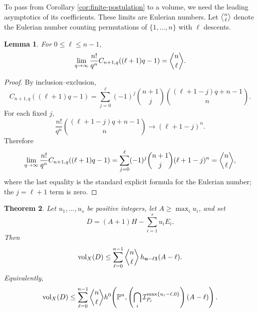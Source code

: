 \documentclass[11pt]{amsart}
\newtheorem{theorem}{Theorem}[section]
\newtheorem{lemma}[theorem]{Lemma}
\theoremstyle{remark}
\newcommand{\PP}{\mathbb P}
\newcommand{\vol}{\operatorname{vol}}
\newcommand{\eul}[2]{\genfrac{\langle}{\rangle}{0pt}{}{#1}{#2}}
\begin{document}
To pass from Corollary \ref{cor:finite-postulation} to a volume, we need the leading asymptotics of its coefficients. These limits are Eulerian numbers. Let $\eul{n}{\ell}$ denote the Eulerian number counting permutations of $\{1,\ldots,n\}$ with $\ell$ descents.


\begin{lemma}\label{lem:Eulerian}
For $0\le\ell\le n-1$,
\begin{equation}\label{eq:Eulerian-limit}
\lim_{q\to\infty}
\frac{n!}{q^n}
C_{n+1,q}((\ell+1)q-1)
=
\eul{n}{\ell}.
\end{equation}
\end{lemma}

\begin{proof}
By inclusion--exclusion,
$$
C_{n+1,q}((\ell+1)q-1)
=
\sum_{j=0}^{\ell}
(-1)^j\binom{n+1}{j}
\binom{(\ell+1-j)q+n-1}{n}.
$$
For each fixed $j$,
$$
\frac{n!}{q^n}
\binom{(\ell+1-j)q+n-1}{n}
\longrightarrow
(\ell+1-j)^n.
$$
Therefore
$$
\lim_{q\to\infty}
\frac{n!}{q^n}
C_{n+1,q}((\ell+1)q-1) =
\sum_{j=0}^{\ell}
(-1)^j\binom{n+1}{j}(\ell+1-j)^n = \eul{n}{\ell},
$$
where the last equality is the standard explicit formula for the Eulerian number; the $j=\ell+1$ term is zero.
\end{proof}

\begin{theorem}\label{thm:Eulerian-volume}
Let $u_1,\ldots,u_s$ be positive integers, let $A\ge\max_i u_i$, and set
$$
D=(A+1)H-\sum_{i=1}^su_iE_i.
$$
Then
\begin{equation}\label{eq:Eulerian-volume}
\vol_X(D)
\le
\sum_{\ell=0}^{n-1}
\eul{n}{\ell}
\,h_{\mathbf u-\ell\mathbf1}(A-\ell).
\end{equation}
Equivalently,
$$
\vol_X(D)
\le
\sum_{\ell=0}^{n-1}
\eul{n}{\ell}
h^0\!\left(
\PP^n,
\left(\bigcap_i\mathcal I_{P_i}^{\max\{u_i-\ell,0\}}\right)(A-\ell)
\right).
$$
\end{theorem}
\end{document}
